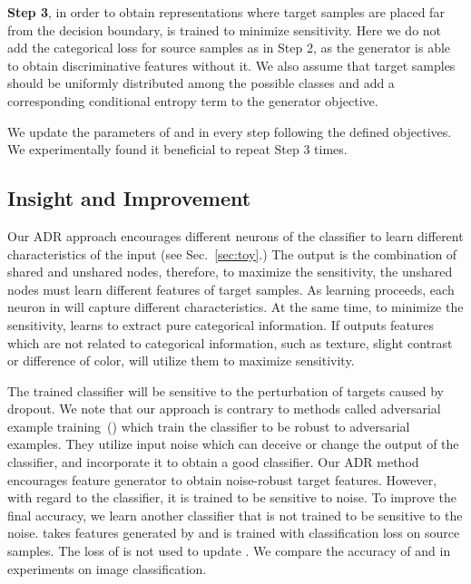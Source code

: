 \documentclass{article} \usepackage{iclr2018_conference,times}
\begin{document}
{\bf Step 3}, in order to obtain representations where target samples are placed far from the decision boundary,  is trained to minimize sensitivity. Here we do not add the categorical loss for source samples as in Step 2, as the generator is able to obtain discriminative features without it. We also assume that target samples should be uniformly distributed among the possible  classes and add a corresponding conditional entropy term to the generator objective. 

We update the parameters of  and  in every step following the defined objectives. We experimentally found it beneficial to repeat Step 3  times.


\subsection{Insight and Improvement}\label{insight}
\vspace{-3mm}        
Our ADR approach encourages different neurons of the classifier  to learn different characteristics of the input (see Sec.~\ref{sec:toy}.) 
The output is the combination of shared and unshared nodes, therefore, to maximize the sensitivity, the unshared nodes must learn different features of target samples. As learning proceeds, each neuron in  will capture different characteristics. At the same time, to minimize the sensitivity,  learns to extract pure categorical information. If  outputs features which are not related to categorical information, such as texture, slight contrast or difference of color,  will utilize them to maximize sensitivity.

The trained classifier will be sensitive to the perturbation of targets caused by dropout. We note that our approach is contrary to methods called adversarial example training~(\cite{goodfellow2014explaining,miyato2015distributional}) which train the classifier to be robust to adversarial examples. They utilize input noise which can deceive or change the output of the classifier, and incorporate it to obtain a good classifier. Our ADR method encourages feature generator to obtain noise-robust target features. However, with regard to the classifier, it is trained to be sensitive to noise. To improve the final accuracy, we learn another classifier  that is not trained to be sensitive to the noise.  takes features generated by  and is trained with classification loss on source samples. The loss of  is not used to update . 
We compare the accuracy of  and  in experiments on image classification.
\end{document}
